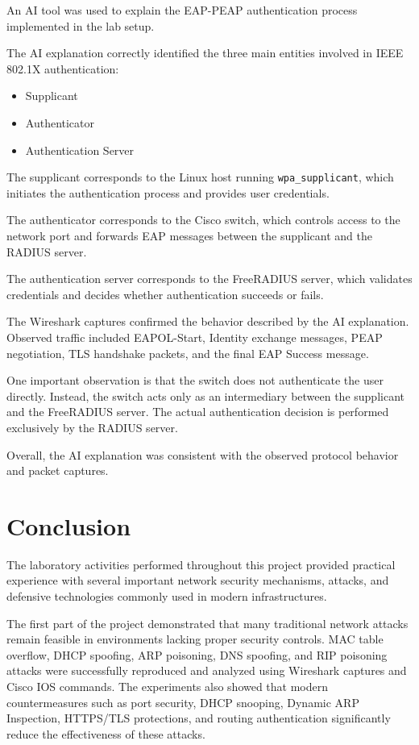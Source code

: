 \documentclass[12pt]{article}
\begin{document}
An AI tool was used to explain the EAP-PEAP
authentication process implemented in the lab setup.

The AI explanation correctly identified the
three main entities involved in IEEE 802.1X authentication:

\begin{itemize}
\item Supplicant
\item Authenticator
\item Authentication Server
\end{itemize}

The supplicant corresponds to the Linux host
running \texttt{wpa\_supplicant}, which initiates
the authentication process and provides user credentials.

The authenticator corresponds to the Cisco switch,
which controls access to the network port and forwards
EAP messages between the supplicant and the RADIUS server.

The authentication server corresponds to the
FreeRADIUS server, which validates credentials
and decides whether authentication succeeds or fails.

The Wireshark captures confirmed the behavior
described by the AI explanation.
Observed traffic included EAPOL-Start,
Identity exchange messages, PEAP negotiation,
TLS handshake packets, and the final EAP Success message.

One important observation is that the switch
does not authenticate the user directly.
Instead, the switch acts only as an intermediary
between the supplicant and the FreeRADIUS server.
The actual authentication decision is performed
exclusively by the RADIUS server.

Overall, the AI explanation was consistent
with the observed protocol behavior and packet captures.
\newpage

\section{Conclusion}

The laboratory activities performed throughout this project provided practical experience with several important network security mechanisms, attacks, and defensive technologies commonly used in modern infrastructures.

The first part of the project demonstrated that many traditional network attacks remain feasible in environments lacking proper security controls. MAC table overflow, DHCP spoofing, ARP poisoning, DNS spoofing, and RIP poisoning attacks were successfully reproduced and analyzed using Wireshark captures and Cisco IOS commands. The experiments also showed that modern countermeasures such as port security, DHCP snooping, Dynamic ARP Inspection, HTTPS/TLS protections, and routing authentication significantly reduce the effectiveness of these attacks.
\end{document}
